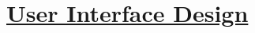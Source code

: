 \section[User Interface Design]{\hyperlink{toc}{User Interface Design}}
	\label{sec:userInterfaceDesign}

